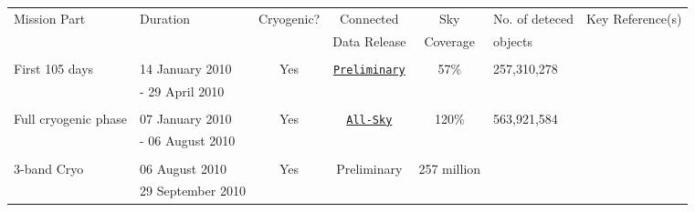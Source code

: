 \documentclass[usenatbib]{mn2e}
\begin{document}
\begin{table*}
  \centering
   \begin{tabular}{l l c c c l r}
\hline
\hline
\multirow{2}{*}{Mission Part}        & \multirow{2}{*}{Duration}                   & \multirow{2}{*}{Cryogenic?}     &  Connected    & Sky          &  No. of deteced & \multirow{2}{*}{Key Reference(s)}\\
                                                     &                                                           &                                                & Data Release & Coverage & objects              &  \\
\hline
\\
\multirow{2}{*}{First 105 days}              &  14 January 2010  & \multirow{2}{*}{Yes}  & \multirow{2}{*}{\href{http://wise2.ipac.caltech.edu/docs/release/prelim/}{{\tt Preliminary}}} & \multirow{2}{*}{57\%}  & \multirow{2}{*}{257,310,278} &  \multirow{2}{*}{\citet{Wright10}} \\
                                                             &  - 29 April 2010    &                                  &                                                                                                                                                  &              &                                           & \\ 
\\
\multirow{2}{*}{Full cryogenic phase} &  07 January 2010     & \multirow{2}{*}{Yes}  & \multirow{2}{*}{\href{http://wise2.ipac.caltech.edu/docs/release/allsky/}{{\tt All-Sky}}}  & \multirow{2}{*}{120\%}  & \multirow{2}{*}{563,921,584}  & \multirow{2}{*}{\citet{Wright10}} \\  
                                                          &  - 06 August 2010    &                                  &                                                                                                                                                 &              &         & \\ 
\\
\multirow{2}{*}{3-band Cryo}             &   06 August 2010   & \multirow{2}{*}{Yes}  & \multirow{2}{*}{Preliminary} & \multirow{2}{*}{257 million} & \\
                                                             &    29 September 2010       &                                  &                                                                                                                                                 &              &         & \\ 

\end{tabular}
\end{table*}
\end{document}
